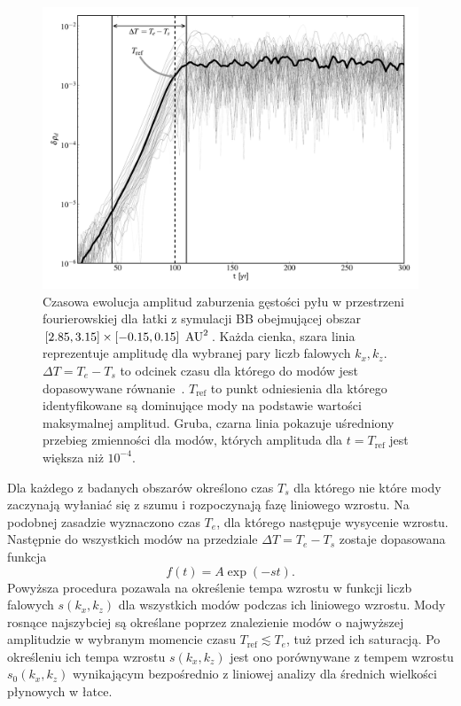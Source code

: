 \begin{figure}
  \includegraphics[width=0.98\linewidth]{figures/fig7}

  \caption{Czasowa ewolucja amplitud zaburzenia gęstości pyłu w przestrzeni
     fourierowskiej dla łatki z symulacji BB obejmującej obszar 
     $[2.85,3.15]\times[-0.15,0.15]~\hbox{$\thinspace\textrm{AU}$}^2$. Każda cienka, szara linia
     reprezentuje amplitudę dla wybranej pary liczb falowych $k_x, k_z$.
     $\Delta T = T_e - T_s$ to odcinek czasu dla którego do modów jest
     dopasowywane równanie~. $T_{\textrm{ref}}$ to punkt
     odniesienia dla którego identyfikowane są dominujące mody na podstawie
     wartości maksymalnej amplitud. Gruba, czarna linia pokazuje uśredniony
     przebieg zmienności dla modów, których amplituda dla $t = T_{\textrm{ref}}$
     jest większa niż $10^{-4}$.} 
   \label{fig7} 
\end{figure}

Dla każdego z badanych obszarów określono czas $T_s$ dla którego nie które mody
zaczynają wyłaniać się z szumu i rozpoczynają fazę liniowego wzrostu. Na
podobnej zasadzie wyznaczono czas $T_e$, dla którego następuje wysycenie
wzrostu. Następnie do wszystkich modów na przedziale $\Delta T = T_e - T_s$
zostaje dopasowana funkcja
%
\begin{equation}
   f(t) = A\exp\left(-s t\right).
   \label{eq:fit}
\end{equation}
%
Powyższa procedura pozawala na określenie tempa wzrostu w funkcji liczb falowych
$s(k_x, k_z)$ dla wszystkich modów podczas ich liniowego wzrostu. Mody rosnące
najszybciej są określane poprzez znalezienie modów o najwyższej amplitudzie w
wybranym momencie czasu $T_{\textrm{ref}} \lesssim T_e$, tuż przed ich
saturacją. Po określeniu ich tempa wzrostu $s(k_x, k_z)$ jest ono porównywane z
tempem wzrostu $s_0(k_x, k_z)$ wynikającym bezpośrednio z liniowej analizy dla
średnich wielkości płynowych w łatce.

